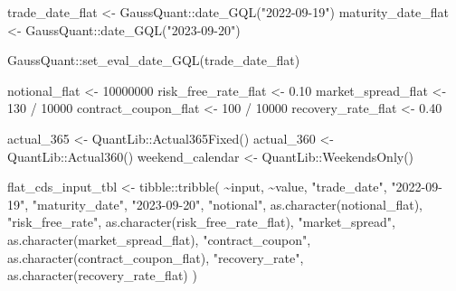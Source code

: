\documentclass[
  letterpaper,
  DIV=11,
  numbers=noendperiod]{scrreprt}
\newenvironment{Shaded}{\begin{snugshade}}{\end{snugshade}}
\newcommand{\DecValTok}[1]{\textcolor[rgb]{0.68,0.00,0.00}{#1}}
\newcommand{\FloatTok}[1]{\textcolor[rgb]{0.68,0.00,0.00}{#1}}
\newcommand{\FunctionTok}[1]{\textcolor[rgb]{0.28,0.35,0.67}{#1}}
\newcommand{\NormalTok}[1]{\textcolor[rgb]{0.00,0.23,0.31}{#1}}
\newcommand{\OtherTok}[1]{\textcolor[rgb]{0.00,0.23,0.31}{#1}}
\newcommand{\SpecialCharTok}[1]{\textcolor[rgb]{0.37,0.37,0.37}{#1}}
\newcommand{\StringTok}[1]{\textcolor[rgb]{0.13,0.47,0.30}{#1}}
\begin{document}
\begin{Shaded}
\begin{Highlighting}[]
\NormalTok{trade\_date\_flat }\OtherTok{\textless{}{-}}\NormalTok{ GaussQuant}\SpecialCharTok{::}\FunctionTok{date\_GQL}\NormalTok{(}\StringTok{"2022{-}09{-}19"}\NormalTok{)}
\NormalTok{maturity\_date\_flat }\OtherTok{\textless{}{-}}\NormalTok{ GaussQuant}\SpecialCharTok{::}\FunctionTok{date\_GQL}\NormalTok{(}\StringTok{"2023{-}09{-}20"}\NormalTok{)}

\NormalTok{GaussQuant}\SpecialCharTok{::}\FunctionTok{set\_eval\_date\_GQL}\NormalTok{(trade\_date\_flat)}

\NormalTok{notional\_flat }\OtherTok{\textless{}{-}} \DecValTok{10000000}
\NormalTok{risk\_free\_rate\_flat }\OtherTok{\textless{}{-}} \FloatTok{0.10}
\NormalTok{market\_spread\_flat }\OtherTok{\textless{}{-}} \DecValTok{130} \SpecialCharTok{/} \DecValTok{10000}
\NormalTok{contract\_coupon\_flat }\OtherTok{\textless{}{-}} \DecValTok{100} \SpecialCharTok{/} \DecValTok{10000}
\NormalTok{recovery\_rate\_flat }\OtherTok{\textless{}{-}} \FloatTok{0.40}

\NormalTok{actual\_365 }\OtherTok{\textless{}{-}}\NormalTok{ QuantLib}\SpecialCharTok{::}\FunctionTok{Actual365Fixed}\NormalTok{()}
\NormalTok{actual\_360 }\OtherTok{\textless{}{-}}\NormalTok{ QuantLib}\SpecialCharTok{::}\FunctionTok{Actual360}\NormalTok{()}
\NormalTok{weekend\_calendar }\OtherTok{\textless{}{-}}\NormalTok{ QuantLib}\SpecialCharTok{::}\FunctionTok{WeekendsOnly}\NormalTok{()}

\NormalTok{flat\_cds\_input\_tbl }\OtherTok{\textless{}{-}}\NormalTok{ tibble}\SpecialCharTok{::}\FunctionTok{tribble}\NormalTok{(}
  \SpecialCharTok{\textasciitilde{}}\NormalTok{input,             }\SpecialCharTok{\textasciitilde{}}\NormalTok{value,}
  \StringTok{"trade\_date"}\NormalTok{,        }\StringTok{"2022{-}09{-}19"}\NormalTok{,}
  \StringTok{"maturity\_date"}\NormalTok{,     }\StringTok{"2023{-}09{-}20"}\NormalTok{,}
  \StringTok{"notional"}\NormalTok{,          }\FunctionTok{as.character}\NormalTok{(notional\_flat),}
  \StringTok{"risk\_free\_rate"}\NormalTok{,    }\FunctionTok{as.character}\NormalTok{(risk\_free\_rate\_flat),}
  \StringTok{"market\_spread"}\NormalTok{,     }\FunctionTok{as.character}\NormalTok{(market\_spread\_flat),}
  \StringTok{"contract\_coupon"}\NormalTok{,   }\FunctionTok{as.character}\NormalTok{(contract\_coupon\_flat),}
  \StringTok{"recovery\_rate"}\NormalTok{,     }\FunctionTok{as.character}\NormalTok{(recovery\_rate\_flat)}
\NormalTok{)}


\end{Highlighting}
\end{Shaded}
\end{document}
